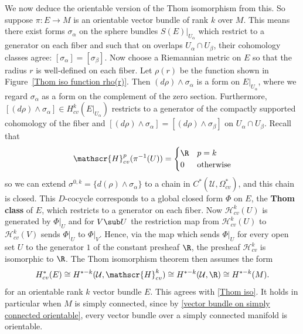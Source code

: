 We now deduce the orientable version of the Thom isomorphism from this. So suppose $\pi:E\to M$ is an orientable vector bundle of rank $k$ over $M$. This means there 
exist forms $\sigma_\alpha$ on the sphere bundles $S(E)|_{U_\alpha}$ which restrict to a generator on each fiber and such that on overlaps $U_\alpha\cap U_\beta$, 
their cohomology classes agree: $[\sigma_\alpha]=[\sigma_\beta]$. Now choose a Riemannian metric on $E$ so that the radius $r$ is well-defined on each fiber. Let $\rho(r)$ 
be the function shown in Figure~\ref{Thom iso function rho(r)}. Then $(d\rho)\wedge\sigma_\alpha$ is a form on $E|_{U_\alpha}$, where we regard $\sigma_\alpha$ as a form 
on the complement of the zero section. Furthermore, $[(d\rho)\wedge\sigma_\alpha]\in H^k_{cv}(E|_{U_\alpha})$ restricts to a generator of the compactly supported 
cohomology of the fiber and $[(d\rho)\wedge\sigma_\alpha]=[(d\rho)\wedge\sigma_\beta]$ on $U_\alpha\cap U_\beta$. Recall that 
\[\mathscr{H}^p_{cv}(\pi^{-1}(U))=\begin{cases}
\R&p=k\\
0&\text{otherwise}
\end{cases}\]
so we can extend $\sigma^{0,k}=\{d(\rho)\wedge\sigma_\alpha\}$ to a chain in $C^*(\mathcal{U},\Omega_{cv}^*)$, and this chain is closed. This $D$-cocycle corresponds 
to a global closed form $\Phi$ on $E$, the \textbf{Thom class} of $E$, which restricts to a generator on each fiber. Now $\mathscr{H}^k_{cv}(U)$ is generated by 
$\Phi|_U$ and for $V\sub U$ the restriction map from $\mathscr{H}^k_{cv}(U)$ to $\mathscr{H}^k_{cv}(V)$ sends $\Phi|_U$ to $\Phi|_V$. Hence, via the map which sends 
$\Phi|_U$ for every open set $U$ to the generator $1$ of the constant presheaf $\R$, the presheaf $\mathscr{H}^k_{cv}$ is isomorphic to $\R$. The Thom isomorphism 
theorem then assumes the form
\[H^*_{cv}(E)\cong H^{*-k}(\mathcal{U},\mathscr{H}^k_{cv})\cong H^{*-k}(\mathcal{U},\R)\cong H^{*-k}(M).\]
for an orientable rank $k$ vector bundle $E$. This agrees with \cref{Thom iso}. It holds in particular when $M$ is simply connected, since by 
\cref{vector bundle on simply connected orientable}, every vector bundle over a simply connected manifold is orientable.
